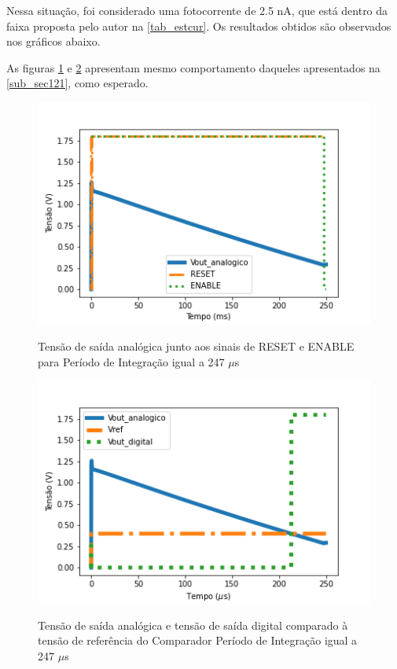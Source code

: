 Nessa situação, foi considerado uma fotocorrente de 2.5 nA, que está dentro da faixa proposta pelo autor na \autoref{tab_estcur}. Os resultados obtidos são observados nos gráficos abaixo.

As figuras \ref{graf247} e \ref{graf2472} apresentam mesmo comportamento daqueles apresentados na \autoref{sub_sec121}, como esperado.

\begin{figure}[!h]
 \centering
    \centering
    \caption{Tensão de saída analógica junto aos sinais de RESET e ENABLE para Período de Integração igual a 247 $\mu$s}
    \includegraphics[scale=0.6]{Resultados/Graficos/reseteenable-tb_pixel250.png}
    \label{graf247}
\end{figure}

\begin{figure}[!h]
 \centering
    \caption{Tensão de saída analógica e tensão de saída digital comparado à tensão de referência do Comparador Período de Integração igual a 247 $\mu$s} 
    \includegraphics[scale=0.6]{Resultados/Graficos/analogicoedigital-tb_pixel250.png}
    \label{graf2472}
\end{figure}

